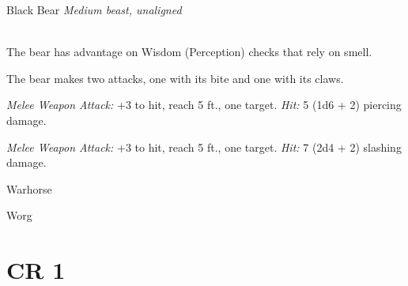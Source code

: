 \documentclass[10pt,twoside,twocolumn,openany]{book}
\begin{document}
\begin{monsterboxnobg}{Black Bear}
	\textit{Medium beast, unaligned}\\
	\hline
	\basics[
		armorclass	= 11 (natural armor),
		hitpoints 		= 19 (3d8 + 6),
		speed		= {40 ft., climb 30 ft.}
	]
	\hline
	\stats[
		STR	= \stat{15}, 
		DEX	= \stat{10},
		CON	= \stat{14},
		INT	= \stat{2},
		WIS	= \stat{12},
		CHA	= \stat{7}
	]
	\hline
	\details[
	skills			= {Perception +3},
	senses		= {passive Perception 11},
	languages		= {-},
	challenge		= 1/2
	]
	\hline \\[1mm]
	\begin{monsteraction}
		The bear has advantage on Wisdom (Perception) checks that rely on smell.
	\end{monsteraction}
	\begin{monsteraction}[Multiattack]
		The bear makes two attacks, one with its bite and one with its claws.
	\end{monsteraction}
	
	\begin{monsteraction}[Bite]
		\textit{Melee Weapon Attack:} +3 to hit, reach 5 ft., one target. \textit{Hit:} 5 (1d6 + 2) piercing damage.
	\end{monsteraction}
	
	\begin{monsteraction}[Claws]
		\textit{Melee Weapon Attack:} +3 to hit, reach 5 ft., one target. \textit{Hit:} 7 (2d4 + 2) slashing damage.
	\end{monsteraction}	
\end{monsterboxnobg}

Warhorse

Worg
\newpage
\section{CR 1}
\end{document}
